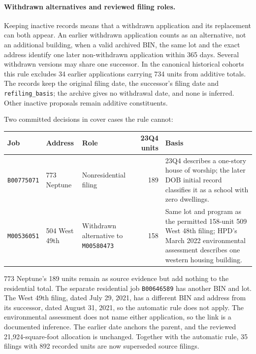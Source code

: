 \paragraph{Withdrawn alternatives and reviewed filing roles.}
Keeping inactive records means that a withdrawn application and its
replacement can both appear. An earlier withdrawn application counts as an
alternative, not an additional building, when a valid archived BIN, the same
lot and the exact address identify one later non-withdrawn application within
365 days. Several withdrawn versions may share one successor. In the canonical
historical cohorts this rule excludes 34 earlier applications carrying 734
units from additive totals. The records keep the original filing date, the
successor's filing date and \texttt{refiling\_basis}; the archive gives no
withdrawal date, and none is inferred. Other inactive proposals remain
additive constituents.

Two committed decisions in 
cover cases the rule cannot:

\begin{center}
\small
\begin{tabular}{llp{}rp{}}
\hline
Job & Address & Role & 23Q4 units & Basis \\
\hline
\texttt{B00775071} & 773 Neptune & Nonresidential filing & 189 &
23Q4 describes a one-story house of worship; the later DOB initial record
classifies it as a school with zero dwellings. \\
\texttt{M00536051} & 504 West 49th & Withdrawn alternative to \texttt{M00580473} & 158 &
Same lot and program as the permitted 158-unit 509 West 48th filing; HPD's
March 2022 environmental assessment describes one western housing building. \\
\hline
\end{tabular}
\end{center}

773 Neptune's 189 units remain as source evidence but add nothing to the
residential total. The separate residential job \texttt{B00646589} has another
BIN and lot. The West 49th filing, dated July 29, 2021, has a different BIN and
address from its successor, dated August 31, 2021, so the automatic rule does
not apply. The environmental assessment does not name either application, so
the link is a documented inference. The earlier date anchors the parent, and
the reviewed 21,924-square-foot allocation is unchanged. Together with the
automatic rule, 35 filings with 892 recorded units are now
superseded source filings.

